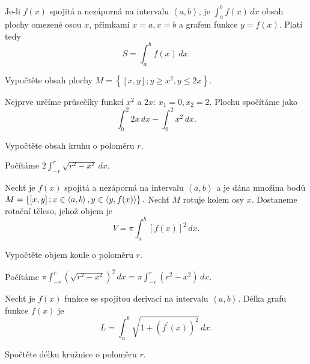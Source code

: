 \begin{pozn}
    Je-li $f(x)$ spojitá a nezáporná na intervalu $\left < a,b \right >$, je
    $\int_a ^b f(x)\, dx$ obsah plochy omezené osou $x$, přímkami $x=a, x=b$ a
    grafem funkce $y=f(x)$. Platí tedy
    $$S=\int_a^b f(x)\, dx.$$
\end{pozn}

\begin{priklad}
Vypočtěte obsah plochy $M=\left \{ [x,y]; y \geq  x^2 , y \leq 2x\right \} $.
\end{priklad}

\begin{reseni}
Nejprve určíme průsečíky funkcí $x^2$ a $2x$: $x_1=0,x_2=2$. Plochu spočítáme
jako
$$\int_0^2 2x\, dx - \int_0^2 x^2 \, dx.$$
\end{reseni}

\begin{priklad}
Vypočtěte obsah kruhu o poloměru $r$.
\end{priklad}

\begin{reseni}
Počítáme $2\int_{-r}^r \sqrt{r^2-x^2}\, dx  $.
\end{reseni}

\begin{pozn}
    Nechť je $f(x)$ spojitá a nezáporná na intervalu $\left < a,b \right >$ a je
    dána množina bodů
    $M=\left \{ \left [ x,y \right ]; x \in \left < a,b \right >,\linebreak y \in \left < y, f(x) \right >    \right \} .$
    Nechť $M$ rotuje kolem osy $x$. Dostaneme rotační těleso, jehož objem je
    $$V=\pi \int _a^b \left [ f(x) \right ]^2 \, dx. $$
\end{pozn}

\begin{priklad}
Vypočtěte objem koule o poloměru $r$.
\end{priklad}

\begin{reseni}
Počítáme $\pi\int _{-r}^r(\sqrt{r^2-x^2} )^2 \, dx=\pi\int_{-r}^r(r^2-x^2)\, dx$.
\end{reseni}

\begin{pozn}
Nechť je $f(x)$ funkce se spojitou derivací na intervalu $\left < a,b \right > $. Délka
grafu funkce $f(x)$ je
$$L=\int_a^b \sqrt{1+(f^\prime(x))^2}\, dx. $$
\end{pozn}

\begin{priklad}
Spočtěte délku kružnice o poloměru $r$.
\end{priklad}

